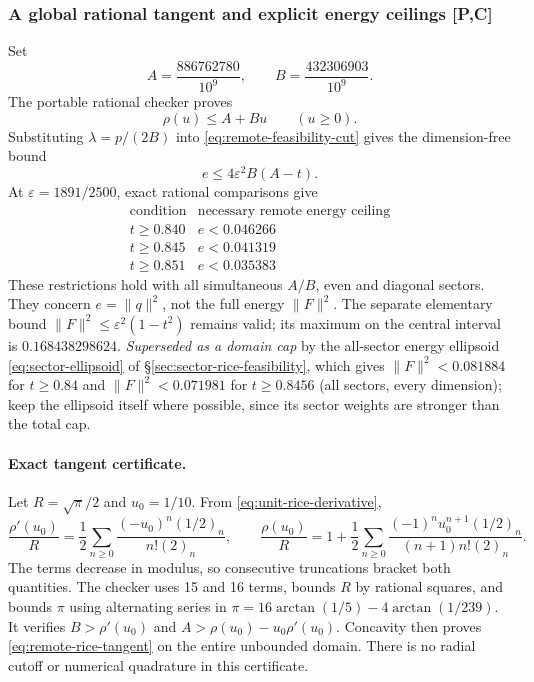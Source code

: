 \subsubsection{A global rational tangent and explicit energy ceilings [P,C]}
Set
\[
 A=\frac{886762780}{10^9},\qquad B=\frac{432306903}{10^9}.
\]
The portable rational checker proves
\begin{equation}\label{eq:remote-rice-tangent}
 \rho(u)\le A+Bu\qquad(u\ge0).
\end{equation}
Substituting $\lambda=p/(2B)$ into
\eqref{eq:remote-feasibility-cut} gives the dimension-free bound
\begin{equation}\label{eq:remote-energy-ceiling}
 \boxed{\quad e\le4\varepsilon^2B(A-t).\quad}
\end{equation}
At $\varepsilon=1891/2500$, exact rational comparisons give
\[
\begin{array}{c|c}
\text{condition}&\text{necessary remote energy ceiling}\\\hline
t\ge0.840&e<0.046266\\
t\ge0.845&e<0.041319\\
t\ge0.851&e<0.035383
\end{array}
\]
These restrictions hold with all simultaneous $A/B$, even and diagonal
sectors. They concern $e=\|q\|^2$, not the full energy $\|F\|^2$.
The separate elementary bound
$\|F\|^2\le\varepsilon^2(1-t^2)$ remains valid; its maximum on the
central interval is $0.168438298624$. \emph{Superseded as a domain cap} by the all-sector energy ellipsoid
\eqref{eq:sector-ellipsoid} of \S\ref{sec:sector-rice-feasibility}, which gives
$\|F\|^2<0.081884$ for $t\ge0.84$ and $\|F\|^2<0.071981$ for $t\ge0.8456$ (all sectors,
every dimension); keep the ellipsoid itself where possible, since its sector weights are
stronger than the total cap.

\paragraph{Exact tangent certificate.}
Let $R=\sqrt\pi/2$ and $u_0=1/10$. From
\eqref{eq:unit-rice-derivative},
\[
 \frac{\rho'(u_0)}R
 =\frac12\sum_{n\ge0}\frac{(-u_0)^n(1/2)_n}{n!(2)_n},
 \qquad
 \frac{\rho(u_0)}R
 =1+\frac12\sum_{n\ge0}
       \frac{(-1)^n u_0^{n+1}(1/2)_n}{(n+1)n!(2)_n}.
\]
The terms decrease in modulus, so consecutive truncations bracket both
quantities. The checker uses 15 and 16 terms, bounds $R$ by rational
squares, and bounds $\pi$ using alternating series in
$\pi=16\arctan(1/5)-4\arctan(1/239)$.
It verifies $B>\rho'(u_0)$ and
$A>\rho(u_0)-u_0\rho'(u_0)$. Concavity then proves
\eqref{eq:remote-rice-tangent} on the entire unbounded domain.
There is no radial cutoff or numerical quadrature in this certificate.

